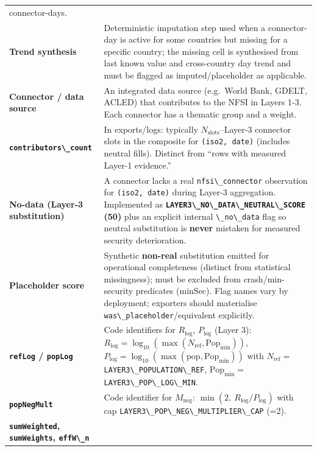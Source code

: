 \documentclass[
  11pt,
  peerreview,journal,onecolumn]{IEEEtran}
\newcommand{\passthrough}[1]{#1}
\begin{document}
\begin{longtable}[]{@{}
  >{\raggedright\arraybackslash}p{}
  >{\raggedright\arraybackslash}p{}@{}}
connector-days. \\
\textbf{Trend synthesis} & Deterministic imputation step used when a
connector-day is active for some countries but missing for a specific
country; the missing cell is synthesised from last known value and
cross-country day trend and must be flagged as imputed/placeholder as
applicable. \\
\textbf{Connector / data source} & An integrated data source (e.g.~World
Bank, GDELT, ACLED) that contributes to the NFSI in Layers 1-3. Each
connector has a thematic group and a weight. \\
\textbf{\passthrough{\lstinline!contributors\_count!}} & In
exports/logs: typically \(N_{\mathrm{slots}}\)--Layer‑3 connector slots
in the composite for \passthrough{\lstinline!(iso2, date)!} (includes
neutral fills). Distinct from ``rows with measured Layer‑1
evidence.'' \\
\textbf{No-data (Layer‑3 substitution)} & A connector lacks a real
\passthrough{\lstinline!nfsi\_connector!} observation for
\passthrough{\lstinline!(iso2, date)!} during Layer‑3 aggregation.
Implemented as
\textbf{\passthrough{\lstinline!LAYER3\_NO\_DATA\_NEUTRAL\_SCORE!} (50)}
plus an explicit internal \passthrough{\lstinline!\_no\_data!} flag so
neutral substitution is \textbf{never} mistaken for measured security
deterioration. \\
\textbf{Placeholder score} & Synthetic \textbf{non-real} substitution
emitted for operational completeness (distinct from statistical
missingness); must be excluded from crash/min-security predicates
(\(\mathrm{minSec}\)). Flag names vary by deployment; exporters should
materialise \passthrough{\lstinline!was\_placeholder!}/equivalent
explicitly. \\
\textbf{\passthrough{\lstinline!refLog!} /
\passthrough{\lstinline!popLog!}} & Code identifiers for \(R_{\log}\),
\(P_{\log}\) (Layer 3):
\(R_{\log}=\log_{10}(\max(N_{\mathrm{ref}},\mathrm{Pop}_{\min}))\),
\(P_{\log}=\log_{10}(\max(\mathrm{pop},\mathrm{Pop}_{\min}))\) with
\(N_{\mathrm{ref}}=\) \passthrough{\lstinline!LAYER3\_POPULATION\_REF!},
\(\mathrm{Pop}_{\min}=\)
\passthrough{\lstinline!LAYER3\_POP\_LOG\_MIN!}. \\
\textbf{\passthrough{\lstinline!popNegMult!}} & Code identifier for
\(M_{\mathrm{neg}}\): \(\min(2,\ R_{\log}/P_{\log})\) with cap
\passthrough{\lstinline!LAYER3\_POP\_NEG\_MULTIPLIER\_CAP!} (=2). \\
\textbf{\passthrough{\lstinline!sumWeighted!},
\passthrough{\lstinline!sumWeights!}, \passthrough{\lstinline!effW\_n!}}

\end{longtable}
\end{document}
